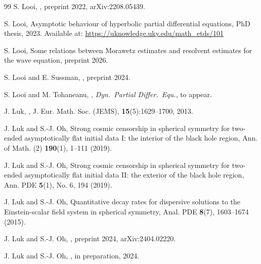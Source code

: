 \documentclass[10pt,a4paper,reqno]{amsart}
\theoremstyle{definition}
\theoremstyle{remark}
\numberwithin{equation}{section}
\begin{document}
\begin{thebibliography}{99}
 S. Looi, 
,
\newblock preprint 2022, arXiv:2208.05439.

 S. Looi,
\newblock Asymptotic behaviour of hyperbolic partial differential equations,
\newblock PhD thesis, 2023.
\newblock Available at: \url{https://uknowledge.uky.edu/math_etds/101}

 S. Looi, 
\newblock Some relations between Morawetz estimates and resolvent estimates for the wave equation,
\newblock preprint 2026. 

 S. Looi and E. Sussman,
,
\newblock preprint 2024.

 S. Looi and M. Tohaneanu, 
, 
\newblock \textit{Dyn.\ Partial Differ.\ Equ.}, to appear.

 J. Luk, 
,
\newblock J. Eur. Math. Soc. (JEMS), \textbf{15}(5):1629--1700, 2013.

 J. Luk and S.-J. Oh,
\newblock Strong cosmic censorship in spherical symmetry for two-ended asymptotically flat initial data I: the interior of the black hole region,
\newblock Ann. of Math. (2) \textbf{190}(1), 1–111 (2019). %

 J. Luk and S.-J. Oh,
\newblock Strong cosmic censorship in spherical symmetry for two-ended asymptotically flat initial data II: the exterior of the black hole region,
\newblock Ann. PDE \textbf{5}(1), No. 6, 194 (2019). %

 J. Luk and S.-J. Oh,
\newblock Quantitative decay rates for dispersive solutions to the Einstein-scalar field system in spherical symmetry,
\newblock Anal. PDE \textbf{8}(7), 1603–1674 (2015).


 J. Luk and S.-J. Oh, 
,
\newblock preprint 2024, arXiv:2404.02220.

 J. Luk and S.-J. Oh,
, 
in preparation, 2024.


\end{thebibliography}
\end{document}
